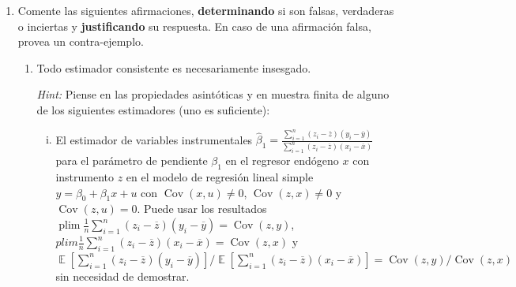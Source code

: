 \documentclass[letterpaper,11pt]{article}
\DeclareMathOperator{\cov}{Cov}
\DeclareMathOperator{\Exp}{\mathbb{E}}
\newcommand{\E}[1]{\Exp\left[#1\right]}
\DeclareMathOperator{\plim}{plim}
\begin{document}
\begin{enumerate}
Para detectar multicolinealidad en la variable $Entrenamiento$ se estima la regresión auxiliar:
\[
Entrenamiento_i = \alpha_0 + \alpha_1 IQ_i + \alpha_2 Edad_i + \alpha_3 Delantero_i + w_i
\]
obteniéndose $R^2_{Entrenamiento} = 0.75$.\\

Con este resultado, se puede afirmar que existe multicolinealidad severa sobre dicha variable. Determine la veracidad de la afirmación, planteando la regla de decisión correspondiente y justificando su respuesta.

    \item  Comente las siguientes afirmaciones, \textbf{determinando} si son falsas, verdaderas o inciertas y \textbf{justificando} su respuesta. En caso de una afirmación falsa, provea un contra-ejemplo.

    \begin{enumerate}
        
        \item  Todo estimador consistente es necesariamente insesgado.

        \medskip
        \textit{Hint:}
        Piense en las propiedades asintóticas y en muestra finita de alguno de los siguientes estimadores (uno es suficiente):
        \begin{enumerate}[(i)]
        
        \item El estimador de variables instrumentales $\widehat \beta_1=\frac{\sum\limits_{i=1}^n\left(z_i - \overline z\right)\left(y_i - \overline y\right)}{\sum\limits_{i=1}^n\left(z_i - \overline z \right) \left(x_i - \overline x \right)}$
        para el parámetro de pendiente $\beta_1$ en el regresor endógeno $x$ con instrumento $z$ en el modelo de regresión lineal simple $y = \beta_0 + \beta_1 x + u$ con $\cov{\left( x, u \right)} \neq 0$, $\cov{\left( z, x \right)} \neq 0$ y $\cov{\left( z, u \right)} = 0$.
        Puede usar los resultados
        $\plim \frac{1}{n} \sum\limits_{i=1}^n \left(z_i - \overline z \right) \left(y_i - \overline y\right)=\cov{\left( z, y \right)}$,
        $plim\frac{1}{n}\sum\limits_{i=1}^n \left(z_i - \overline z \right) \left(x_i - \overline x \right)=\cov{\left( z, x \right)}$
        y
        $\E{\sum\limits_{i=1}^n\left(z_i - \overline z\right)\left(y_i - \overline y \right)} /\E{\sum\limits_{i=1}^n \left( z_i - \overline z \right)\left( x_i - \overline x \right)} =\cov{\left( z, y \right)}/\cov{\left( z, x \right)}$ sin necesidad de demostrar.
                

\end{enumerate}
\end{enumerate}
\end{enumerate}
\end{document}
